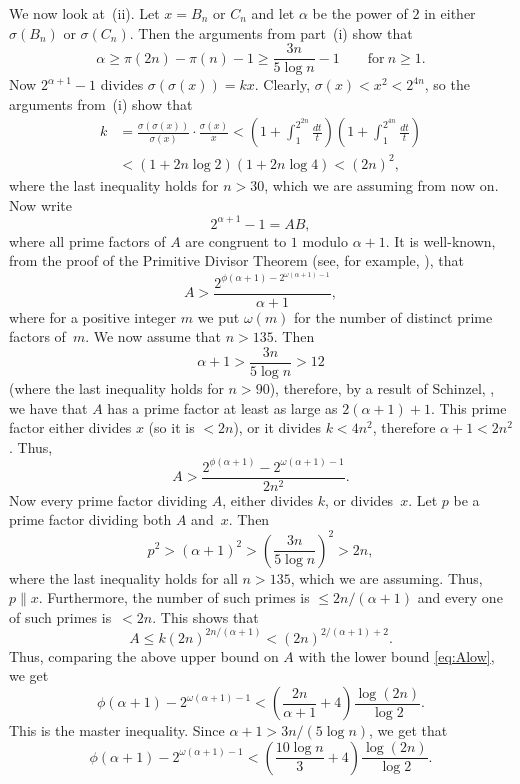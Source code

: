\documentclass[twoside,amsthm]{elsart}
\begin{document}
We now look at~(ii). Let $x=B_n$ or $C_n$ and let $\alpha$ be the
power of $2$ in either $\sigma(B_n)$ or $\sigma(C_n)$. Then the
arguments from part~(i) show that
$$
\alpha\ge \pi(2n)-\pi(n)-1\ge \frac{3n}{5\log n}-1
\qquad {\text{for}}~n\ge 1.
$$
Now $2^{\alpha+1}-1$ divides $\sigma(\sigma(x))=kx$. Clearly,
$\sigma(x)<x^2<2^{4n}$, so the arguments from~(i) show that
\begin{align*}
k & = \frac{\sigma(\sigma(x))}{\sigma(x)} \cdot \frac{\sigma(x)}{x}
< \left(1+\int_1^{2^{2n}} \frac{dt}{t}\right)
\left(1+\int_1^{2^{4n}} \frac{dt}{t}\right) \\
& <  (1+2n\log 2)(1+2n\log 4) < (2n)^2,
\end{align*}
where the last inequality holds for $n>30$, which we are assuming
from now on. Now write
$$
2^{\alpha+1}-1=AB,
$$
where all prime factors of $A$ are congruent to $1$ modulo
$\alpha+1$. It is well-known, from the proof of the Primitive
Divisor Theorem (see, for example, \cite{Z}), that
$$
A > \frac{2^{\phi(\alpha+1) - 2^{\omega(\alpha+1)-1}}}{\alpha+1},
$$
where for a positive integer $m$ we put $\omega(m)$ for the number
of distinct prime factors of~$m$. We now assume that $n>135$. Then
$$
\alpha+1 > \frac{3n}{5\log n} > 12
$$
(where the last inequality holds for $n>90$), therefore, by a result
of Schinzel, \cite{Sch}, we have that $A$ has a prime factor at
least as large as $2(\alpha+1)+1$. This prime factor either divides
$x$ (so it is $<2n$), or it divides $k<4n^2$, therefore
$\alpha+1<2n^2$. Thus,
\begin{equation}
\label{eq:Alow}
A > \frac{2^{\phi(\alpha+1)}-2^{\omega(\alpha+1)-1}}{2n^2}.
\end{equation}
Now every prime factor dividing $A$, either divides $k$, or divides~$x$.
Let $p$ be a prime factor dividing both $A$ and~$x$. Then
$$
p^2 > (\alpha+1)^2 > \left(\frac{3 n}{5\log n}\right)^2 > 2n,
$$
where the last inequality holds for all $n>135$, which we are
assuming. Thus, $p \parallel x$. Furthermore, the number of such primes is
$\le 2n/(\alpha+1)$ and every one of such primes is~$<2n$. This
shows that
$$
A\le k(2n)^{2n/(\alpha+1)}<(2n)^{2/(\alpha+1)+2}.
$$
Thus, comparing the above upper bound on $A$ with the lower bound
\eqref{eq:Alow}, we get
\begin{equation}
\label{eq:master}
\phi(\alpha+1) - 2^{\omega(\alpha+1)-1} 
< \left(\frac{2n}{\alpha+1}+4\right)
\frac{\log(2n)}{\log 2}.
\end{equation}
This is the master inequality. Since $\alpha+1>3n/(5\log n)$, we get
that
\begin{equation}
\label{eq:up}
\phi(\alpha+1)-2^{\omega(\alpha+1)-1} 
< \left(\frac{10\log n}{3}+4\right) \frac{\log(2n)}{\log 2}.
\end{equation}
\end{document}
